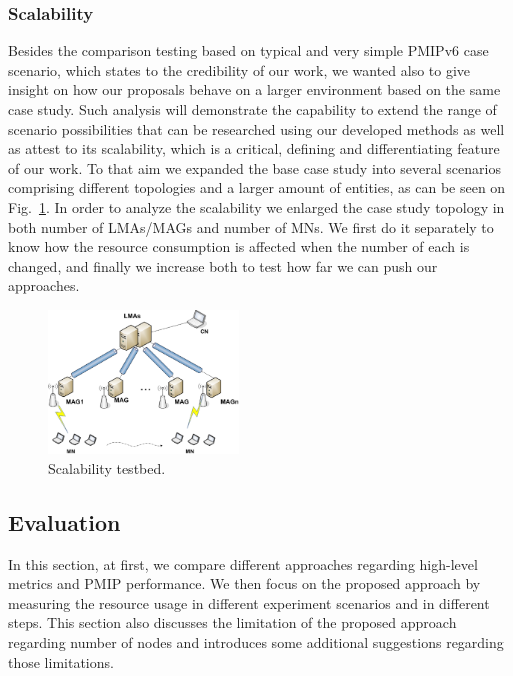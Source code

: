 \subsubsection{Scalability}
Besides the comparison testing based on typical and very simple PMIPv6 case scenario, which states to the credibility of our work, we wanted also to give insight on how our proposals behave on a larger environment based on the same case study. Such analysis will demonstrate the capability to extend the range of scenario possibilities that can be researched using our developed methods as well as attest to its scalability, which is a critical, defining and differentiating feature of our work. To that aim we expanded the base case study into several scenarios comprising different topologies and a larger amount of entities, as can be seen on Fig.~\ref{fig:c5_scalability_testbed}. In order to analyze the scalability we enlarged the case study topology in both number of LMAs/MAGs and number of MNs. We first do it separately to know how the resource consumption is affected when the number of each is changed, and finally we increase both to test how far we can push our approaches.
\begin{figure}[tb!] 
  \begin{center} 
    \includegraphics[width=0.45\textwidth]{./Part1/Chapter3/figures/c5_scalability_testbed.eps} 
    \caption[Illustration of the scalability tesbed.]{Scalability testbed.}
    \label{fig:c5_scalability_testbed}
  \end{center} 
\end{figure}  
\subsection{Evaluation} 
In this section, at first, we compare different approaches regarding high-level metrics and PMIP performance. We then focus on the proposed approach by measuring the resource usage in different experiment scenarios and in different steps. This section also discusses the limitation of the proposed approach regarding number of nodes and introduces some additional suggestions regarding those limitations.


